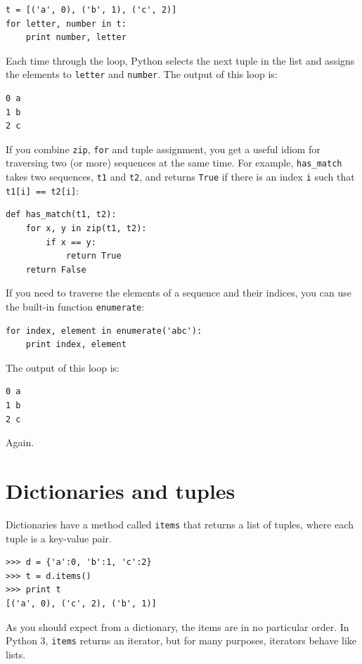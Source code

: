 \documentclass[10pt]{book}
\begin{document}
\begin{verbatim}
t = [('a', 0), ('b', 1), ('c', 2)]
for letter, number in t:
    print number, letter
\end{verbatim}
%
Each time through the loop, Python selects the next tuple in
the list and assigns the elements to {\tt letter} and
{\tt number}.  The output of this loop is:

\begin{verbatim}
0 a
1 b
2 c
\end{verbatim}
%
If you combine {\tt zip}, {\tt for} and tuple assignment, you get a
useful idiom for traversing two (or more) sequences at the same
time.  For example, \verb"has_match" takes two sequences, {\tt t1} and
{\tt t2}, and returns {\tt True} if there is an index {\tt i}
such that {\tt t1[i] == t2[i]}:

\begin{verbatim}
def has_match(t1, t2):
    for x, y in zip(t1, t2):
        if x == y:
            return True
    return False
\end{verbatim}
%
If you need to traverse the elements of a sequence and their
indices, you can use the built-in function {\tt enumerate}:

\begin{verbatim}
for index, element in enumerate('abc'):
    print index, element
\end{verbatim}
%
The output of this loop is:

\begin{verbatim}
0 a
1 b
2 c
\end{verbatim}
%
Again.


\section{Dictionaries and tuples}
\label{dictuple}

Dictionaries have a method called {\tt items} that returns a list of
tuples, where each tuple is a key-value pair.

\begin{verbatim}
>>> d = {'a':0, 'b':1, 'c':2}
>>> t = d.items()
>>> print t
[('a', 0), ('c', 2), ('b', 1)]
\end{verbatim}
%
As you should expect from a dictionary, the items are in no
particular order.  In Python 3, {\tt items} returns an iterator,
but for many purposes, iterators behave like lists.
\end{document}
